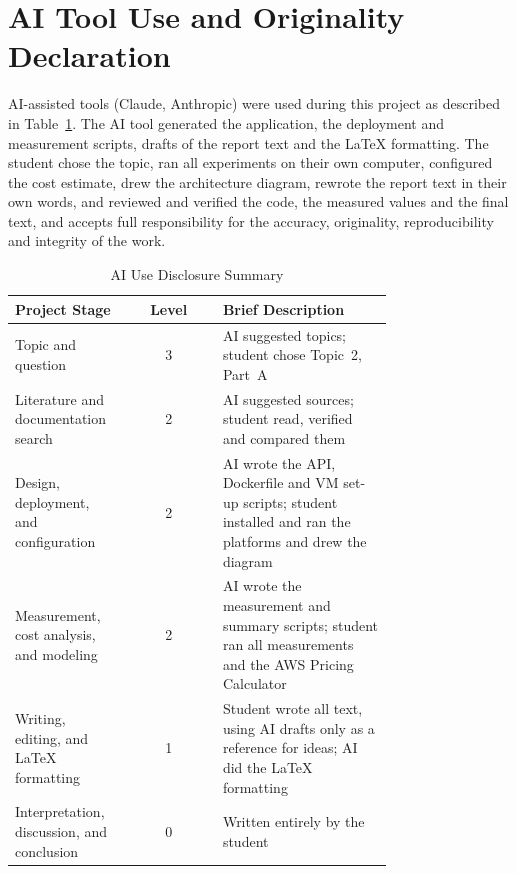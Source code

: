 \documentclass[conference,a4paper]{IEEEtran}
\begin{document}
\section*{AI Tool Use and Originality Declaration}
\label{sec:ai_declaration}
AI-assisted tools (Claude, Anthropic) were used during this project as described in Table~\ref{tab:ai_use}. The AI tool generated the application, the deployment and measurement scripts, drafts of the report text and the LaTeX formatting. The student chose the topic, ran all experiments on their own computer, configured the cost estimate, drew the architecture diagram, rewrote the report text in their own words, and reviewed and verified the code, the measured values and the final text, and accepts full responsibility for the accuracy, originality, reproducibility and integrity of the work.

\begin{table}[htbp]
	\caption{AI Use Disclosure Summary}
	\label{tab:ai_use}
	\centering
	\footnotesize
	\begin{tabular}{|p{0.30\linewidth}|c|p{0.45\linewidth}|}
		\hline
		\textbf{Project Stage} & \textbf{Level} & \textbf{Brief Description} \\
		\hline
		Topic and question & 3 & AI suggested topics; student chose Topic~2, Part~A \\
		\hline
		Literature and documentation search & 2 & AI suggested sources; student read, verified and compared them \\
		\hline
		Design, deployment, and configuration & 2 & AI wrote the API, Dockerfile and VM set-up scripts; student installed and ran the platforms and drew the diagram \\
		\hline
		Measurement, cost analysis, and modeling & 2 & AI wrote the measurement and summary scripts; student ran all measurements and the AWS Pricing Calculator \\
		\hline
		Writing, editing, and LaTeX formatting & 1 & Student wrote all text, using AI drafts only as a reference for ideas; AI did the LaTeX formatting \\
		\hline
		Interpretation, discussion, and conclusion & 0 & Written entirely by the student \\
		\hline
	\end{tabular}
\end{table}
\end{document}
